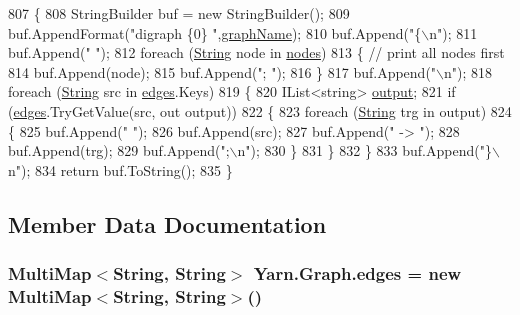 \begin{DoxyCode}
807         \{
808             StringBuilder buf = \textcolor{keyword}{new} StringBuilder();
809             buf.AppendFormat(\textcolor{stringliteral}{"digraph \{0\} "},\hyperlink{a00098_a8605f1ec5a4e9cfd07d3ac2be042dac6}{graphName});
810             buf.Append(\textcolor{stringliteral}{"\{\(\backslash\)n"});
811             buf.Append(\textcolor{stringliteral}{"  "});
812             \textcolor{keywordflow}{foreach} (\hyperlink{a00041_a301aa7c866593a5b625a8fc158bbeacea27118326006d3829667a400ad23d5d98}{String} node \textcolor{keywordflow}{in} \hyperlink{a00098_a506df6f737a41748c01239bdea5d82b1}{nodes})
813             \{ \textcolor{comment}{// print all nodes first}
814                 buf.Append(node);
815                 buf.Append(\textcolor{stringliteral}{"; "});
816             \}
817             buf.Append(\textcolor{stringliteral}{"\(\backslash\)n"});
818             \textcolor{keywordflow}{foreach} (\hyperlink{a00041_a301aa7c866593a5b625a8fc158bbeacea27118326006d3829667a400ad23d5d98}{String} src \textcolor{keywordflow}{in} \hyperlink{a00098_a8adf7c937ab5c584b49698283e3da150}{edges}.Keys)
819             \{
820                 IList<string> \hyperlink{a00330_a3da6d48778c7b08a040bf24377f67792}{output};
821                 \textcolor{keywordflow}{if} (\hyperlink{a00098_a8adf7c937ab5c584b49698283e3da150}{edges}.TryGetValue(src, out output))
822                 \{
823                     \textcolor{keywordflow}{foreach} (\hyperlink{a00041_a301aa7c866593a5b625a8fc158bbeacea27118326006d3829667a400ad23d5d98}{String} trg \textcolor{keywordflow}{in} output)
824                     \{
825                         buf.Append(\textcolor{stringliteral}{"  "});
826                         buf.Append(src);
827                         buf.Append(\textcolor{stringliteral}{" -> "});
828                         buf.Append(trg);
829                         buf.Append(\textcolor{stringliteral}{";\(\backslash\)n"});
830                     \}
831                 \}
832             \}
833             buf.Append(\textcolor{stringliteral}{"\}\(\backslash\)n"});
834             \textcolor{keywordflow}{return} buf.ToString();
835         \}
\end{DoxyCode}


\subsection{Member Data Documentation}
\hypertarget{a00098_a8adf7c937ab5c584b49698283e3da150}{
\subsubsection[{edges}]{\setlength{\rightskip}{0pt plus 5cm}Multi\-Map$<${\bf String}, {\bf String}$>$ Yarn.\-Graph.\-edges = new Multi\-Map$<${\bf String}, {\bf String}$>$()}}\label{a00098_a8adf7c937ab5c584b49698283e3da150}


